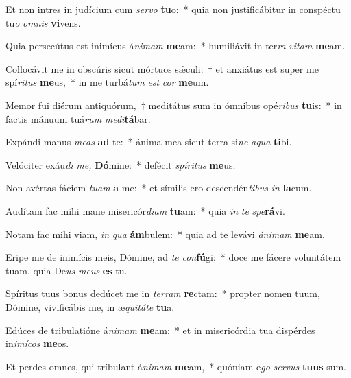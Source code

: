 \item Et non intres in judícium cum \textit{servo} \textbf{tu}o:~* quia non justificábitur in conspé\-ctu tu\textit{o} \textit{omnis} \textbf{vi}vens.
\item Quia persecútus est inimícus á\textit{nimam} \textbf{me}am:~* humiliávit in ter\textit{ra} \textit{vitam} \textbf{me}am.
\item Collocávit me in obscúris sicut mórtuos sǽculi:~† et anxiátus est super me spí\textit{ritus} \textbf{me}us,~* in me turbá\tinyhspace\textit{tum} \textit{est} \textit{cor} \textbf{me}um.
\item Memor fui diérum antiquórum,~† meditátus sum in ómnibus opé\hspace{0.02em}\textit{ribus} \textbf{tu}is:~* in factis mánuum tuá\hspace{0.02em}\textit{rum} \textit{medi}\textbf{tá}bar.
\item Expándi manus \textit{meas} \textbf{ad} te:~* ánima mea sicut terra si\textit{ne} \textit{aqua} \textbf{ti}bi.
\item Velóciter exáu\textit{di} \textit{me,} \textbf{Dó}mine:~* defécit \textit{spíritus} \textbf{me}us.
\item Non avértas fáciem \textit{tuam} \textbf{a} me:~* et símilis ero descendén\textit{tibus} \textit{in} \textbf{la}cum.
\item Audítam fac mihi mane misericór\textit{diam} \textbf{tu}am:~* quia \textit{in} \textit{te} \textit{spe}\textbf{rá}vi.
\item Notam fac mihi viam, \textit{in} \textit{qua} \textbf{ám}bulem:~* quia ad te levávi \textit{ánimam} \textbf{me}am.
\item Eripe me de inimícis meis, Dómine, ad \textit{te} \textit{con}\textbf{fú}gi:~* doce me fácere voluntátem tuam, quia De\textit{us} \textit{meus} \textbf{es} tu.
\item Spíritus tuus bonus dedúcet me in \textit{terram} \textbf{re}ctam:~* propter nomen tuum, Dómine, vivificábis me, in æ\hspace{0.02em}\textit{quitáte} \textbf{tu}a.
\item Edúces de tribulatióne á\textit{nimam} \textbf{me}am:~* et in misericórdia tua dispérdes in\textit{imícos} \textbf{me}os.
\item Et perdes omnes, qui tríbulant á\textit{nimam} \textbf{me}am,~* quóniam e\textit{go} \textit{servus} \textbf{tu}\textbf{us} sum.
